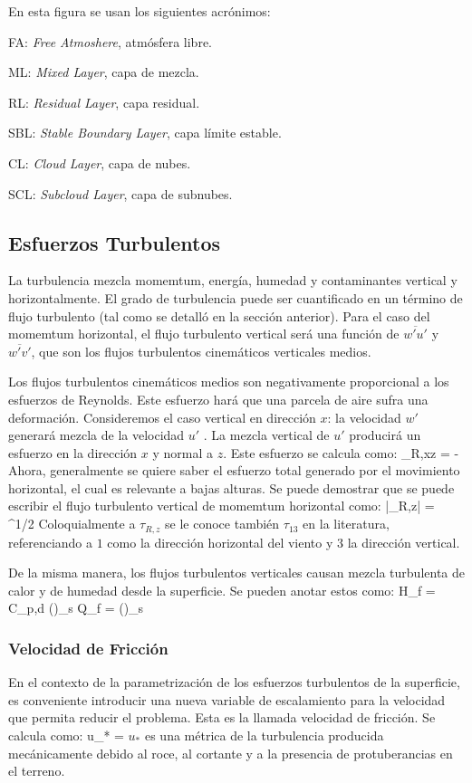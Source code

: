 En esta figura se usan los siguientes acrónimos:
\begin{itemize*}
	\item FA: \emph{Free Atmoshere}, atmósfera libre.
	\item ML: \emph{Mixed Layer}, capa de mezcla.
	\item RL: \emph{Residual Layer}, capa residual.
	\item SBL: \emph{Stable Boundary Layer}, capa límite estable.
	\item CL: \emph{Cloud Layer}, capa de nubes.
	\item SCL: \emph{Subcloud Layer}, capa de subnubes.
\end{itemize*}
\subsection{Esfuerzos Turbulentos}
La turbulencia mezcla momemtum, energía, humedad y contaminantes vertical y horizontalmente. El grado de turbulencia puede ser cuantificado en un término de flujo turbulento (tal como se detalló en la sección anterior). Para el caso del momemtum horizontal, el flujo turbulento vertical será una función de $\overline{w'u'}$ y $\overline{w'v'}$, que son los flujos turbulentos cinemáticos verticales medios.

Los flujos turbulentos cinemáticos medios son negativamente proporcional a los esfuerzos de Reynolds. Este esfuerzo hará que una parcela de aire sufra una deformación. Consideremos el caso vertical en dirección $x$: la velocidad $w'$ generará mezcla de la velocidad $u'$ . La mezcla vertical de $u'$ producirá un esfuerzo en la dirección $x$ y normal a $z$. Este esfuerzo se calcula como:
\be 
\tau_{R,xz} = - \rho {}
\ee
Ahora, generalmente se quiere saber el esfuerzo total generado por el movimiento horizontal, el cual es relevante a bajas alturas. Se puede demostrar que se puede escribir el flujo turbulento vertical de momemtum horizontal como:
\be 
|\tau_{R,z}| = ^{1/2}
\ee
Coloquialmente a $\tau_{R,z}$ se le conoce también $\tau_{13}$ en la literatura, referenciando a $1$ como la dirección horizontal del viento y $3$ la dirección vertical.

De la misma manera, los flujos turbulentos verticales causan mezcla turbulenta de calor y de humedad desde la superficie. Se pueden anotar estos como:
\be H_f = \rho C_{p,d} ()_s \ee
\be Q_f = \rho ()_s \ee
\subsubsection{Velocidad de Fricción}
En el contexto de la parametrización de los esfuerzos turbulentos de la superficie, es conveniente introducir una nueva variable de escalamiento para la velocidad que permita reducir el problema. Esta es la llamada velocidad de fricción. Se calcula como:
\be u_* =  \ee
$u_*$ es una métrica de la turbulencia producida mecánicamente debido al roce, al cortante y a la presencia de protuberancias en el terreno.
